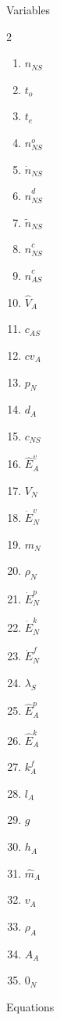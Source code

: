 \documentclass[10pt,a4paper]{report}
\begin{document}
	\Large{Variables}
	
	\begin{multicols}{2}
		\begin{enumerate}
			\item $n_{NS}$
			\item $t_o$
			\item $t_e$
			\item $n^{o}_{NS}$
			\item $\dot{n}_{NS}$
			\item $\hat{n}^{d}_{NS}$
			\item $\tilde{n}_{NS}$
			\item $\hat{n}^{c}_{NS}$
			\item $\hat{n}^{c}_{AS}$
			\item $\hat{V}_{A}$
			\item $c_{AS}$
			\item $cv_A$
			\item $p_N$
			\item $d_A$
			\item $c_{NS}$
			\item $\hat{E}^{v}_{A}$
			\item $V_N$
			\item $\dot{E}^{v}_N$
			\item $m_N$
			\item $\rho_N$
			\item $\dot{E}^{p}_N$
			\item $\dot{E}^{k}_N$
			\item $\dot{E}^{f}_N$
			\item $\lambda_S$
			\item $\hat{E}^{p}_{A}$
			\item $\hat{E}^{k}_{A}$
			\item $k^{f}_A$
			\item $l_A$
			\item $g$
			\item $h_A$
			\item $\hat{m}_A$
			\item $v_A$
			\item $\rho_A$
			\item $A_A$
			\item $0_N$
		\end{enumerate}
	\end{multicols}	
	\newpage
	\Large{Equations}
\end{document}
